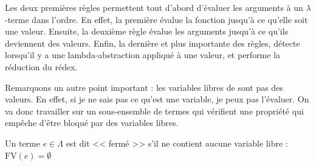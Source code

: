 \documentclass[11pt]{article}
\begin{document}
Les deux premières règles permettent tout d'abord d'évaluer les arguments à un $\lambda$-terme dans l'ordre. En effet, la première évalue la fonction jusqu'à ce qu'elle soit une valeur. Ensuite, la deuxième règle évalue les arguments jusqu'à ce qu'ils deviennent des valeurs. Enfin, la dernière et plus importante des règles, détecte lorsqu'il y a une lambda-abstraction appliqué à une valeur, et performe la réduction du rédex.

Remarquons un autre point important : les variables libres de sont pas des valeurs. En effet, si je ne sais pas ce qu'est une variable, je peux pas l'évaluer. On va donc travailler sur un sous-ensemble de termes qui vérifient une propriété qui empêche d'être bloqué par des variables libres.

\begin{definition}
    Un terme $e\in\Lambda$ est dit << fermé >> s'il ne contient aucune variable libre : $\text{FV}(e)=\emptyset$
\end{definition}
\end{document}
